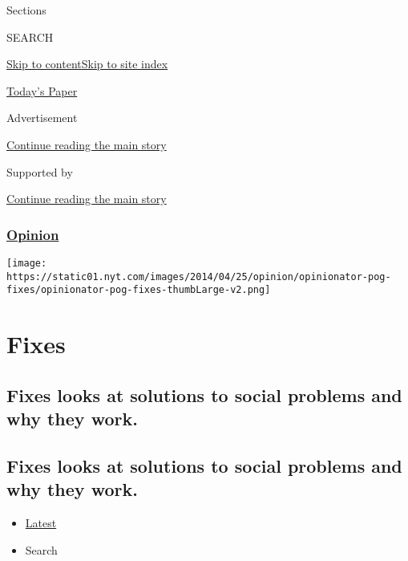 Sections

SEARCH

\protect\hyperlink{site-content}{Skip to
content}\protect\hyperlink{site-index}{Skip to site index}

\href{https://myaccount.nytimes.com/auth/login?response_type=cookie\&client_id=vi}{}

\href{https://www.nytimes.com/section/todayspaper}{Today's Paper}

Advertisement

\protect\hyperlink{after-top}{Continue reading the main story}

Supported by

\protect\hyperlink{after-sponsor}{Continue reading the main story}

\hypertarget{opinion}{%
\subsubsection{\texorpdfstring{\href{/section/opinion}{Opinion}}{Opinion}}\label{opinion}}

\texttt{[image: https://static01.nyt.com/images/2014/04/25/opinion/opinionator-pog-fixes/opinionator-pog-fixes-thumbLarge-v2.png]}

\hypertarget{fixes}{%
\section{Fixes}\label{fixes}}

\hypertarget{fixes-looks-at-solutions-to-social-problems-and-why-they-work}{%
\subsection{Fixes looks at solutions to social problems and why they
work.}\label{fixes-looks-at-solutions-to-social-problems-and-why-they-work}}

\hypertarget{fixes-looks-at-solutions-to-social-problems-and-why-they-work-1}{%
\subsection{Fixes looks at solutions to social problems and why they
work.}\label{fixes-looks-at-solutions-to-social-problems-and-why-they-work-1}}

\begin{itemize}
\tightlist
\item
  \protect\hyperlink{stream-panel}{Latest}
\item
  Search
\end{itemize}

